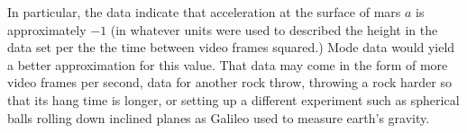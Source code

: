 \documentclass[12pt]{article}
\begin{document}
In particular, the data indicate that acceleration at the surface of mars $a$ is approximately $-1$ (in whatever units were used to described the height in the data set per the the time between video frames squared.) Mode data would yield a better approximation for this value. That data may come in the form of more video frames per second, data for another rock throw, throwing a rock harder so that its hang time is longer, or setting up a different experiment such as spherical balls rolling down inclined planes as Galileo used to measure earth's gravity. 
\end{document}
